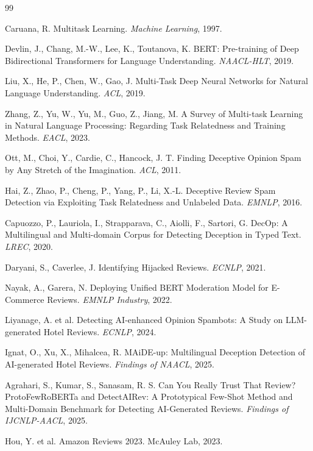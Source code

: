 \documentclass[12pt,a4paper]{article}
\begin{document}
\begin{thebibliography}{99}

Caruana, R. Multitask Learning. \textit{Machine Learning}, 1997.

Devlin, J., Chang, M.-W., Lee, K., Toutanova, K. BERT: Pre-training of Deep Bidirectional Transformers for Language Understanding. \textit{NAACL-HLT}, 2019.

Liu, X., He, P., Chen, W., Gao, J. Multi-Task Deep Neural Networks for Natural Language Understanding. \textit{ACL}, 2019.

Zhang, Z., Yu, W., Yu, M., Guo, Z., Jiang, M. A Survey of Multi-task Learning in Natural Language Processing: Regarding Task Relatedness and Training Methods. \textit{EACL}, 2023.

Ott, M., Choi, Y., Cardie, C., Hancock, J. T. Finding Deceptive Opinion Spam by Any Stretch of the Imagination. \textit{ACL}, 2011.

Hai, Z., Zhao, P., Cheng, P., Yang, P., Li, X.-L. Deceptive Review Spam Detection via Exploiting Task Relatedness and Unlabeled Data. \textit{EMNLP}, 2016.

Capuozzo, P., Lauriola, I., Strapparava, C., Aiolli, F., Sartori, G. DecOp: A Multilingual and Multi-domain Corpus for Detecting Deception in Typed Text. \textit{LREC}, 2020.

Daryani, S., Caverlee, J. Identifying Hijacked Reviews. \textit{ECNLP}, 2021.

Nayak, A., Garera, N. Deploying Unified BERT Moderation Model for E-Commerce Reviews. \textit{EMNLP Industry}, 2022.

Liyanage, A. et al. Detecting AI-enhanced Opinion Spambots: A Study on LLM-generated Hotel Reviews. \textit{ECNLP}, 2024.

Ignat, O., Xu, X., Mihalcea, R. MAiDE-up: Multilingual Deception Detection of AI-generated Hotel Reviews. \textit{Findings of NAACL}, 2025.

Agrahari, S., Kumar, S., Sanasam, R. S. Can You Really Trust That Review? ProtoFewRoBERTa and DetectAIRev: A Prototypical Few-Shot Method and Multi-Domain Benchmark for Detecting AI-Generated Reviews. \textit{Findings of IJCNLP-AACL}, 2025.

Hou, Y. et al. Amazon Reviews 2023. McAuley Lab, 2023.


\end{thebibliography}
\end{document}
